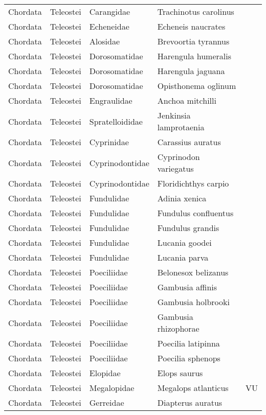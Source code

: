 \begin{longtable}{lllll}
  Chordata & Teleostei & Carangidae & Trachinotus carolinus &  \\ 
  Chordata & Teleostei & Echeneidae & Echeneis naucrates &  \\ 
  Chordata & Teleostei & Alosidae & Brevoortia tyrannus &  \\ 
  Chordata & Teleostei & Dorosomatidae & Harengula humeralis &  \\ 
  Chordata & Teleostei & Dorosomatidae & Harengula jaguana &  \\ 
  Chordata & Teleostei & Dorosomatidae & Opisthonema oglinum &  \\ 
  Chordata & Teleostei & Engraulidae & Anchoa mitchilli &  \\ 
  Chordata & Teleostei & Spratelloididae & Jenkinsia lamprotaenia &  \\ 
  Chordata & Teleostei & Cyprinidae & Carassius auratus &  \\ 
  Chordata & Teleostei & Cyprinodontidae & Cyprinodon variegatus &  \\ 
  Chordata & Teleostei & Cyprinodontidae & Floridichthys carpio &  \\ 
  Chordata & Teleostei & Fundulidae & Adinia xenica &  \\ 
  Chordata & Teleostei & Fundulidae & Fundulus confluentus &  \\ 
  Chordata & Teleostei & Fundulidae & Fundulus grandis &  \\ 
  Chordata & Teleostei & Fundulidae & Lucania goodei &  \\ 
  Chordata & Teleostei & Fundulidae & Lucania parva &  \\ 
  Chordata & Teleostei & Poeciliidae & Belonesox belizanus &  \\ 
  Chordata & Teleostei & Poeciliidae & Gambusia affinis &  \\ 
  Chordata & Teleostei & Poeciliidae & Gambusia holbrooki &  \\ 
  Chordata & Teleostei & Poeciliidae & Gambusia rhizophorae &  \\ 
  Chordata & Teleostei & Poeciliidae & Poecilia latipinna &  \\ 
  Chordata & Teleostei & Poeciliidae & Poecilia sphenops &  \\ 
  Chordata & Teleostei & Elopidae & Elops saurus &  \\ 
  Chordata & Teleostei & Megalopidae & Megalops atlanticus & VU \\ 
  Chordata & Teleostei & Gerreidae & Diapterus auratus &  \\ 

\end{longtable}
